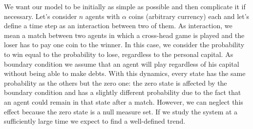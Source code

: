 We want our model to be initially as simple as possible and then complicate it if necessary.
Let's consider $n$ agents with $\alpha$ coins (arbitrary currency) each and let's define a time step as an interaction between two of them.
As interaction, we mean a match between two agents in which a cross-head game is played and the loser has to pay one coin to the winner.
In this case, we consider the probability to win equal to the probability to lose, regardless to the personal capital.
As boundary condition we assume that an agent will play regardless of his capital without being able to make debts. 
With this dynamics, every state has the same probability as the others but the zero one: the zero state is affected by the boundary condition and has a slightly different probability due to the fact that an agent could remain in that state after a match.
However, we can neglect this effect because the zero state is a null measure set.
If we study the system at a sufficiently large time we expect to find a well-defined trend.

